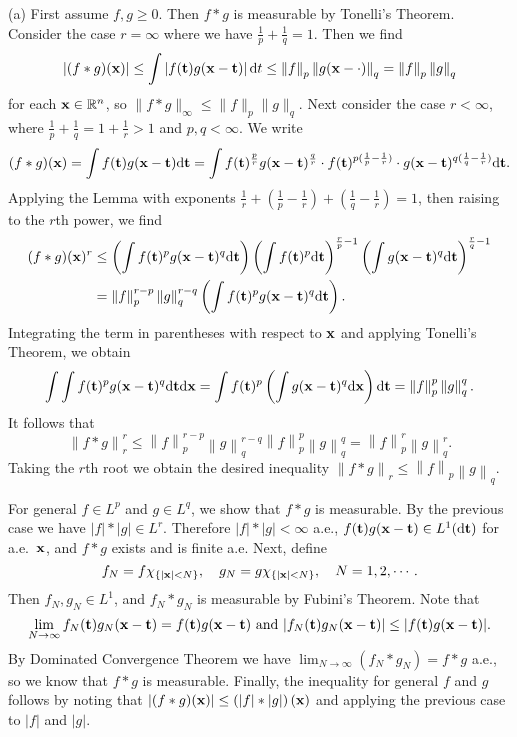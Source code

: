 \begin{exercise}{9.2}
  (a)
  First assume $f, g \ge 0$.
  Then $f * g$ is measurable by Tonelli's Theorem.
  Consider the case $r = \infty$ where we have $\frac{1}{p} + \frac{1}{q} = 1$.
  Then we find
  \[
    \left| (f * g)(\mathbf{x}) \right| \le \int \left| f(\mathbf{t}) g(\mathbf{x}-\mathbf{t}) \right| \mathrm{d} t
    \le \left\| f \right\|_p \left\| g(\mathbf{x}-\cdot) \right\|_q
    = \left\| f \right\|_p \left\| g \right\|_q
  \]
  for each $\mathbf{x} \in \mathbb{R}^n$, so $\| f*g \|_{\infty} \le \|f\|_p \|g\|_q$.
  Next consider the case $r < \infty$,
  where $\frac{1}{p} + \frac{1}{q} = 1 + \frac{1}{r} > 1$
  and $p, q < \infty$.
  We write
  \[
    (f*g)(\mathbf{x}) = \int f(\mathbf{t}) g(\mathbf{x}-\mathbf{t}) \mathrm{d} \mathbf{t}
    = \int f(\mathbf{t})^{\frac{p}{r}} g(\mathbf{x}-\mathbf{t})^{\frac{q}{r}}
    \cdot f(\mathbf{t})^{p(\frac1p - \frac1r)}
    \cdot g(\mathbf{x} - \mathbf{t})^{q(\frac1q - \frac1r)} \mathrm{d} \mathbf{t}.
  \]
  Applying the Lemma
  with exponents
  $\frac{1}{r} + (\frac{1}{p} - \frac{1}{r})
  + (\frac{1}{q} - \frac{1}{r}) = 1$,
  then raising to the $r$th power,
  we find
  \[
    \begin{aligned}
    (f*g)(\mathbf{x})^r
    &\le
    \left( \int f(\mathbf{t})^p g(\mathbf{x}-\mathbf{t})^q \mathrm{d} \mathbf{t} \right)
    \left( \int f(\mathbf{t})^p \mathrm{d} \mathbf{t} \right)^{\frac rp - 1}
    \left( \int g(\mathbf{x}-\mathbf{t})^q \mathrm{d} \mathbf{t} \right)^{\frac rq - 1} \\
    &= \left\| f \right\|_p^{r-p} \left\| g \right\|_{q}^{r-q}
      \left( \int f(\mathbf{t})^p g(\mathbf{x}-\mathbf{t})^q \mathrm{d} \mathbf{t} \right).
    \end{aligned}
  \]
  Integrating the term in parentheses with respect to $\mathbf{x}$
  and applying Tonelli's Theorem, we obtain
  \[
    \int \int f(\mathbf{t})^p g(\mathbf{x}-\mathbf{t})^q \mathrm{d} \mathbf{t} \mathrm{d} \mathbf{x}
    = \int f(\mathbf{t})^p \left( \int g(\mathbf{x}-\mathbf{t})^q \mathrm{d} \mathbf{x} \right) \mathrm{d} \mathbf{t}
    = \left\| f \right\|_p^p \left\| g \right\|_q^q.
  \]
  It follows that
  \[
    \left\| f*g \right\|_r^r \le
    \left\| f \right\|_p^{r-p} \left\| g \right\|_{q}^{r-q}
    \left\| f \right\|_p^p \left\| g \right\|_q^q
    = \left\| f \right\|_p^r \left\| g \right\|_q^r.
  \]
  Taking the $r$th root we obtain the desired inequality
  $\left\| f*g \right\|_r \le \left\| f \right\|_p \left\| g \right\|_q$.

  For general $f \in L^p$ and $g \in L^q$,
  we show that $f * g$ is measurable.
  By the previous case we have $|f| * |g| \in L^r$.
  Therefore $|f| * |g| < \infty$ a.e.,
  $f(\mathbf{t}) g(\mathbf{x} - \mathbf{t}) \in L^1(\mathrm{d} \mathbf{t})$ for a.e.\ $\mathbf{x}$,
  and $f*g$ exists and is finite a.e.
  Next, define
  \[
    f_N = f \chi_{\{|\mathbf{x}| < N\}}, \quad
    g_N = g \chi_{\{|\mathbf{x}| < N\}}, \quad
    N = 1, 2, \cdots.
  \]
  Then $f_N, g_N \in L^1$,
  and $f_N * g_N$ is measurable by Fubini's Theorem.
  Note that
  \[
    \lim_{N \rightarrow \infty} f_N(\mathbf{t}) g_N(\mathbf{x} - \mathbf{t})
    = f(\mathbf{t}) g(\mathbf{x} - \mathbf{t})
    \text{ and }
    |f_N(\mathbf{t}) g_N(\mathbf{x} - \mathbf{t})| \le |f(\mathbf{t}) g(\mathbf{x}-\mathbf{t})|.
  \]
  By Dominated Convergence Theorem
  we have $\lim_{N \rightarrow \infty} (f_N * g_N) = f * g$ a.e.,
  so we know that $f * g$ is measurable.
  Finally, the inequality for general $f$ and $g$
  follows by noting that
  $\left| (f*g)(\mathbf{x}) \right| \le \left( |f|*|g| \right) (\mathbf{x})$
  and applying the previous case to $|f|$ and $|g|$.


\end{exercise}
